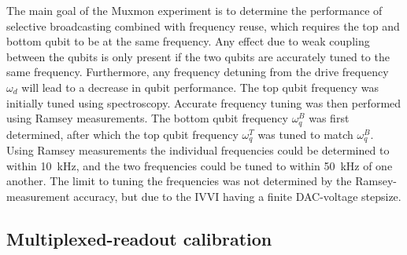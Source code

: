         The main goal of the Muxmon experiment is to determine the performance of selective broadcasting combined with frequency reuse, which requires the top and bottom qubit to be at the same frequency. Any effect due to weak coupling between the qubits is only present if the two qubits are accurately tuned to the same frequency. Furthermore, any frequency detuning from the drive frequency $\omega_d$ will lead to a decrease in qubit performance. The top qubit frequency was initially tuned using spectroscopy. Accurate frequency tuning was then performed using Ramsey measurements. The bottom qubit frequency $\omega_q^B$ was first determined, after which the top qubit frequency $\omega_q^T$  was tuned to match $\omega_q^B$. Using Ramsey measurements the individual frequencies could be determined to within \SI{10}{\kilo \hertz}, and the two frequencies could be tuned to within \SI{50}{\kilo \hertz} of one another. The limit to tuning the frequencies was not determined by the Ramsey-measurement accuracy, but due to the IVVI having a finite DAC-voltage stepsize.

      \subsection{Multiplexed-readout calibration}
        \label{ssec:multiplexed readout}

